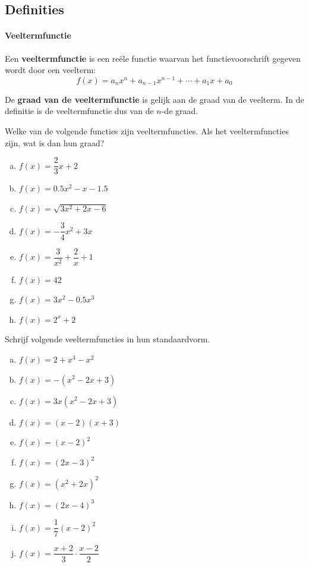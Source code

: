 \documentclass[12pt]{article}
\begin{document}
\begin{theorie}

\subsection{Definities}

\paragraph*{Veeltermfunctie}
\begin{mdframed}
  Een {\bf veeltermfunctie} is een reële functie waarvan het functievoorschrift gegeven wordt door een veelterm:
  $$f(x)= a_nx^n + a_{n-1}x^{n-1} + \cdots + a_1x + a_0$$
\end{mdframed}

De {\bf graad van de veeltermfunctie} is gelijk aan de graad van de veelterm. In de definitie is de veeltermfunctie dus van de $n$-de graad.

\end{theorie}

\begin{oefening}
  Welke van de volgende functies zijn veeltermfuncties. Als het veeltermfuncties zijn, wat is dan hun graad?
\begin{multicols}{2}
  \begin{enumerate}[(a)]
  \itemsep1em
  \item $f(x)=\dfrac{2}{3}x+2$
  \item $f(x)=0.5x^2-x-1.5$
  \item $f(x)=\sqrt{3x^2+2x-6}$
  \item $f(x)=-\dfrac{3}{4}x^2+3x$
  \item $f(x)=\dfrac{3}{x^2}+\dfrac{2}{x}+1$
  \item $f(x)=42$
  \item $f(x)=3x^2-0.5x^3$
  \item $f(x)=2^x+2$
  \end{enumerate}
\end{multicols}
\end{oefening}

\begin{oefening}
Schrijf volgende veeltermfuncties in hun standaardvorm.
\begin{multicols}{2}
  \begin{enumerate}[(a)]
  \itemsep1em
  \item $f(x)=2+x^3-x^2$
  \item $f(x)=-(x^2-2x+3)$
  \item $f(x)=3x(x^2-2x+3)$
  \item $f(x)=(x-2)(x+3)$
  \item $f(x)=(x-2)^2$
  \item $f(x)=(2x-3)^2$
  \item $f(x)=(x^2+2x)^2$
  \item $f(x)=(2x-4)^3$
  \item $f(x)=\dfrac{1}{7}(x-2)^2$
  \item $f(x)=\dfrac{x+2}{3}\cdot\dfrac{x-2}{2}$
  \end{enumerate}
\end{multicols}
\end{oefening}
\end{document}

